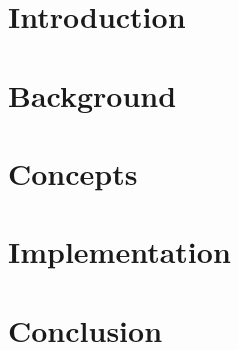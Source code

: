 \documentclass[11pt]{report}
\begin{document}
  
  
  
  
  
  \tableofcontents
  
  \chapter{Introduction}
  \label{cha:intro}
  
    
  
  \chapter{Background}
  \label{cha:background}
  
    
  
  \chapter{Concepts}
  \label{cha:concepts}
  
    
  
  \chapter{Implementation}
  \label{cha:impl}
  
    
    
  \chapter{Conclusion}
  \label{cha:conc}
  
    
  
\end{document}
